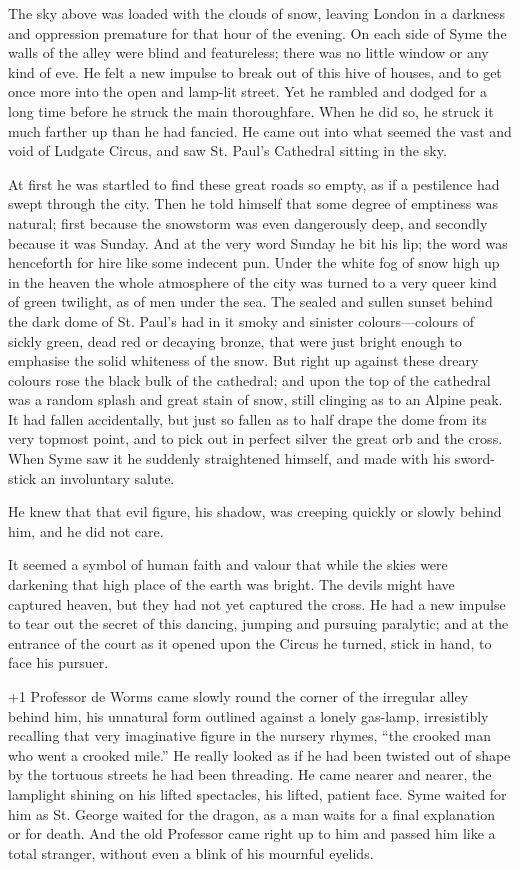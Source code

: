 The sky above was loaded with the clouds of snow, leaving London in a darkness and oppression premature for that hour of the evening. On each side of Syme the walls of the alley were blind and featureless; there was no little window or any kind of eve. He felt a new impulse to break out of this hive of houses, and to get once more into the open and lamp-lit street. Yet he rambled and dodged for a long time before he struck the main thoroughfare. When he did so, he struck it much farther up than he had fancied. He came out into what seemed the vast and void of Ludgate Circus, and saw St. Paul’s Cathedral sitting in the sky.

At first he was startled to find these great roads so empty, as if a pestilence had swept through the city. Then he told himself that some degree of emptiness was natural; first because the snowstorm was even dangerously deep, and secondly because it was Sunday. And at the very word Sunday he bit his lip; the word was henceforth for hire like some indecent pun. Under the white fog of snow high up in the heaven the whole atmosphere of the city was turned to a very queer kind of green twilight, as of men under the sea. The sealed and sullen sunset behind the dark dome of St. Paul’s had in it smoky and sinister colours⁠—colours of sickly green, dead red or decaying bronze, that were just bright enough to emphasise the solid whiteness of the snow. But right up against these dreary colours rose the black bulk of the cathedral; and upon the top of the cathedral was a random splash and great stain of snow, still clinging as to an Alpine peak. It had fallen accidentally, but just so fallen as to half drape the dome from its very topmost point, and to pick out in perfect silver the great orb and the cross. When Syme saw it he suddenly straightened himself, and made with his sword-stick an involuntary salute.

He knew that that evil figure, his shadow, was creeping quickly or slowly behind him, and he did not care.

It seemed a symbol of human faith and valour that while the skies were darkening that high place of the earth was bright. The devils might have captured heaven, but they had not yet captured the cross. He had a new impulse to tear out the secret of this dancing, jumping and pursuing paralytic; and at the entrance of the court as it opened upon the Circus he turned, stick in hand, to face his pursuer.

\looseness+1
Professor de Worms came slowly round the corner of the irregular alley behind him, his unnatural form outlined against a lonely gas-lamp, irresistibly recalling that very imaginative figure in the nursery rhymes, “the crooked man who went a crooked mile.” He really looked as if he had been twisted out of shape by the tortuous streets he had been threading. He came nearer and nearer, the lamplight shining on his lifted spectacles, his lifted, patient face. Syme waited for him as St. George waited for the dragon, as a man waits for a final explanation or for death. And the old Professor came right up to him and passed him like a total stranger, without even a blink of his mournful eyelids.

